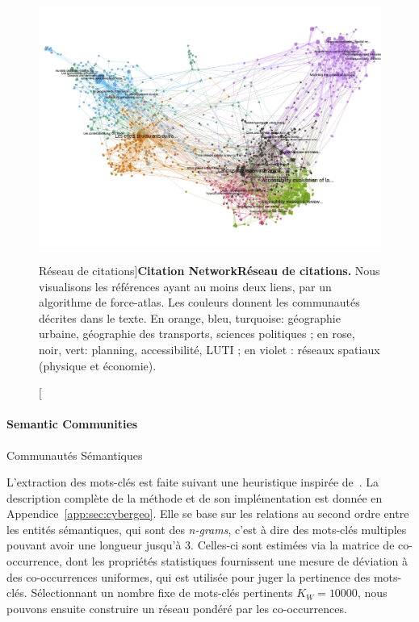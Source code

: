 \begin{figure}[!ht]
\includegraphics[width=\linewidth]{Figures/QuantEpistemo/rawcore}
\caption[Citation Network][Réseau de citations]{\textbf{Citation Network}\label{fig:quantepistemo:citnw}}{\textbf{Réseau de citations.} Nous visualisons les références ayant au moins deux liens, par un algorithme de force-atlas. Les couleurs donnent les communautés décrites dans le texte. En orange, bleu, turquoise: géographie urbaine, géographie des transports, sciences politiques ; en rose, noir, vert: planning, accessibilité, LUTI ; en violet : réseaux spatiaux (physique et économie).\label{fig:quantepistemo:citnw}}
\end{figure}





\paragraph{Semantic Communities}{Communautés Sémantiques}


L'extraction des mots-clés est faite suivant une heuristique inspirée de~\cite{chavalarias2013phylomemetic}. La description complète de la méthode et de son implémentation est donnée en Appendice~\ref{app:sec:cybergeo}. Elle se base sur les relations au second ordre entre les entités sémantiques, qui sont des \emph{n-grams}, c'est à dire des mots-clés multiples pouvant avoir une longueur jusqu'à 3. Celles-ci sont estimées via la matrice de co-occurrence, dont les propriétés statistiques fournissent une mesure de déviation à des co-occurrences uniformes, qui est utilisée pour juger la pertinence des mots-clés. Sélectionnant un nombre fixe de mots-clés pertinents $K_W = 10000$, nous pouvons ensuite construire un réseau pondéré par les co-occurrences.


